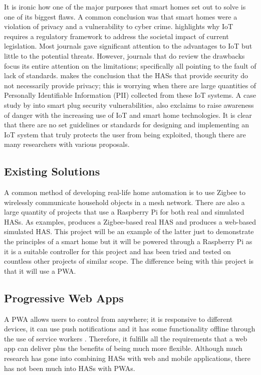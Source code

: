 \documentclass[final]{cmpreport}
\begin{document}
    It is ironic how one of the major purposes that smart homes set out to solve is one of its biggest flaws. A common conclusion was that smart homes were a violation of privacy and a vulnerability to cyber crime. \cite{iotlegislation} highlights why IoT requires a regulatory framework to address the societal impact of current legislation. Most journals gave significant attention to the advantages to IoT but little to the potential threats. However, journals that do review the drawbacks focus its entire attention on the limitations; specifically all pointing to the fault of lack of standards. \cite{PrivacyImpact} makes the conclusion that the HASs that provide security do not necessarily provide privacy; this is worrying when there are large quantities of Personally Identifiable Information (PII) collected from these IoT systems. A case study by \cite{smartplug} into smart plug security vulnerabilities, also exclaims to raise awareness of danger with the increasing use of IoT and smart home technologies. It is clear that there are no set guidelines or standards for designing and implementing an IoT system that truly protects the user from being exploited, though there are many researchers with various proposals.
    
    \subsection{Existing Solutions}
    
    A common method of developing real-life home automation is to use Zigbee to wirelessly communicate household objects in a mesh network. There are also a large quantity of projects that use a Raspberry Pi for both real and simulated HASs. As examples, \cite{homeiot} produces a Zigbee-based real HAS and \cite{androidhas} produces a web-based simulated HAS. This project will be an example of the latter just to demonstrate the principles of a smart home but it will be powered through a Raspberry Pi as it is a suitable controller for this project and has been tried and tested on countless other projects of similar scope. The difference being with this project is that it will use a PWA. 
    
    \subsection{Progressive Web Apps}
    
    A PWA allows users to control from anywhere; it is responsive to different devices, it can use push notifications and it has some functionality offline through the use of service workers \citep{pwa}. Therefore, it fulfills all the requirements that a web app can deliver plus the benefits of being much more flexible. Although much research has gone into combining HASs with web and mobile applications, there has not been much into HASs with PWAs.
    
\end{document}
